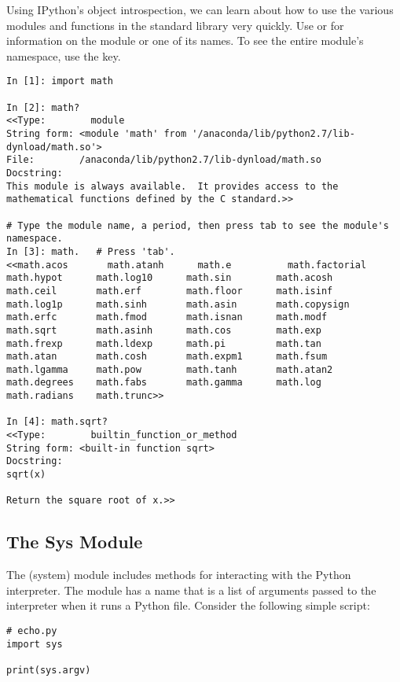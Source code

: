 Using IPython's object introspection, we can learn about how to use the various modules and functions in the standard library very quickly.
Use  or  for information on the module or one of its names.
To see the entire module's namespace, use the  key.

\begin{lstlisting}
In [1]: import math

In [2]: math?
<<Type:        module
String form: <module 'math' from '/anaconda/lib/python2.7/lib-dynload/math.so'>
File:        /anaconda/lib/python2.7/lib-dynload/math.so
Docstring:
This module is always available.  It provides access to the
mathematical functions defined by the C standard.>>

# Type the module name, a period, then press tab to see the module's namespace.
In [3]: math.   # Press 'tab'.
<<math.acos       math.atanh      math.e          math.factorial  
math.hypot      math.log10      math.sin        math.acosh      
math.ceil       math.erf        math.floor      math.isinf      
math.log1p      math.sinh       math.asin       math.copysign   
math.erfc       math.fmod       math.isnan      math.modf       
math.sqrt       math.asinh      math.cos        math.exp        
math.frexp      math.ldexp      math.pi         math.tan        
math.atan       math.cosh       math.expm1      math.fsum       
math.lgamma     math.pow        math.tanh       math.atan2      
math.degrees    math.fabs       math.gamma      math.log        
math.radians    math.trunc>>

In [4]: math.sqrt?
<<Type:        builtin_function_or_method
String form: <built-in function sqrt>
Docstring:
sqrt(x)

Return the square root of x.>>
\end{lstlisting}

\subsection*{The Sys Module}

The  (system) module includes methods for interacting with the Python interpreter.
The module has a name  that is a list of arguments passed to the interpreter when it runs a Python file.
Consider the following simple script:

\begin{lstlisting}
# echo.py
import sys

print(sys.argv)
\end{lstlisting}

